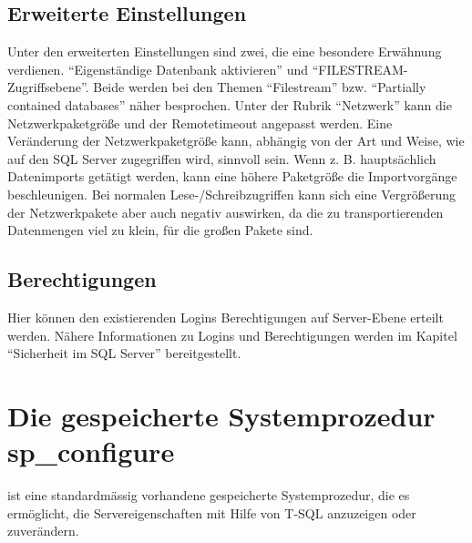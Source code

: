       \subsection{Erweiterte Einstellungen}
        Unter den erweiterten Einstellungen sind zwei, die eine
        besondere Erwähnung verdienen. \enquote{Eigenständige Datenbank
        aktivieren} und \enquote{FILESTREAM-Zugriffsebene}. Beide werden bei den
        Themen \enquote{Filestream} bzw. \enquote{Partially contained databases}
        näher besprochen.
        Unter der Rubrik \enquote{Netzwerk} kann die Netzwerkpaketgröße und
        der Remotetimeout angepasst werden. Eine Veränderung der
        Netzwerkpaketgröße kann, abhängig von der Art und Weise, wie auf den
        SQL Server zugegriffen wird, sinnvoll sein. Wenn z. B. hauptsächlich
        Datenimports getätigt werden, kann eine höhere Paketgröße die
        Importvorgänge beschleunigen. Bei normalen Lese-/Schreibzugriffen kann
        sich eine Vergrößerung der Netzwerkpakete aber auch negativ auswirken,
        da die zu transportierenden Datenmengen viel zu klein, für die großen
        Pakete sind.
        \begin{literaturinternet}
          \item \cite{ms189357}
        \end{literaturinternet}          
      \subsection{Berechtigungen}
        Hier können den existierenden Logins Berechtigungen auf Server-Ebene
        erteilt werden. Nähere Informationen zu Logins und Berechtigungen
        werden im Kapitel \enquote{Sicherheit im SQL Server} bereitgestellt.
        
    \section{Die gespeicherte Systemprozedur sp\_configure}
       ist eine standardmässig vorhandene
      gespeicherte Systemprozedur, die es ermöglicht, die
      Servereigenschaften mit Hilfe von T-SQL anzuzeigen oder zuverändern.
